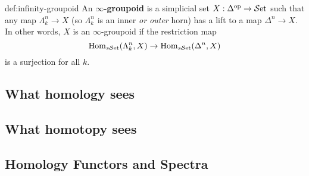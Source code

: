 \begin{definition}{def:infinity-groupoid}
	An \textbf{$\infty$-groupoid} is a simplicial set $X : \Delta^\text{op} \to {\mathcal{S}\text{et}}$ such that any map $\Lambda^n_k \to X$ (so $\Lambda^n_k$ is an inner \textit{or outer} horn) has a lift to a map $\Delta^n \to X$. In other words, $X$ is an $\infty$-groupoid if the restriction map
	\[
	{\text{Hom}}_{s{\mathcal{S}\text{et}}}(\Lambda^n_k,X)
	\to
	{\text{Hom}}_{s{\mathcal{S}\text{et}}}(\Delta^n,X) 
	\]
is a surjection for all $k$.
\end{definition}






















\newpage
\subsection{What homology sees}
\subsection{What homotopy sees}
\subsection{Homology Functors and Spectra}
